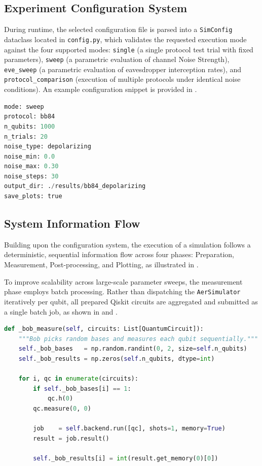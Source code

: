 \documentclass[11pt, a4paper]{report}
\begin{document}
\newpage
\subsection{Experiment Configuration System}
\label{subsec:config}

During runtime, the selected configuration file is parsed into a \texttt{SimConfig} dataclass located in \texttt{config.py}, which validates the requested execution mode against the four supported modes: \texttt{single} (a single protocol test trial with fixed parameters), \texttt{sweep} (a parametric evaluation of channel Noise Strength), \texttt{eve\_sweep} (a parametric evaluation of eavesdropper interception rates), and \texttt{protocol\_comparison} (execution of multiple protocols under identical noise conditions). An example configuration snippet is provided in .

\begin{lstlisting}[language=Python, caption={Example YAML Configuration for a BB84 Noise Sweep.}, label={lst:yaml-config}]
mode: sweep
protocol: bb84
n_qubits: 1000
n_trials: 20
noise_type: depolarizing
noise_min: 0.0
noise_max: 0.30
noise_steps: 30
output_dir: ./results/bb84_depolarizing
save_plots: true
\end{lstlisting}

\subsection{System Information Flow}
\label{subsec:infoflow}

Building upon the configuration system, the execution of a simulation follows a deterministic, sequential information flow across four phases: Preparation, Measurement, Post-processing, and Plotting, as illustrated in .

To improve scalability across large-scale parameter sweeps, the measurement phase employs batch processing. Rather than dispatching the \texttt{AerSimulator} iteratively per \gls{qubit}, all prepared Qiskit circuits are aggregated and submitted as a single batch job, as shown in  and .

\begin{lstlisting}[language=Python,
  caption={Individual Circuit Processing.},
  label={lst:individual}]
def _bob_measure(self, circuits: List[QuantumCircuit]):
    """Bob picks random bases and measures each qubit sequentially."""
    self._bob_bases   = np.random.randint(0, 2, size=self.n_qubits)
    self._bob_results = np.zeros(self.n_qubits, dtype=int)

    for i, qc in enumerate(circuits):
        if self._bob_bases[i] == 1:
            qc.h(0)
        qc.measure(0, 0)

        job    = self.backend.run([qc], shots=1, memory=True)
        result = job.result()

        self._bob_results[i] = int(result.get_memory(0)[0])
\end{lstlisting}
\end{document}
